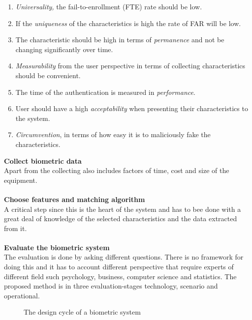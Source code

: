 \begin{enumerate}
	\item \textit{Universality,} the fail-to-enrollment (FTE) rate should be low.
	\item If the \textit{uniqueness} of the characteristics is high the rate of FAR will be low. 
	\item The characteristic should be high in terms of \textit{permanence} and not be changing significantly over time.
	\item \textit{Measurability} from the user perspective in terms of collecting characteristics should be convenient.
	\item The time of the authentication is measured in \textit{performance}.
	\item User should have a high \textit{acceptability} when presenting their characteristics to the system.
	\item \textit{Circumvention}, in terms of how easy it is to maliciously fake the characteristics.
\end{enumerate} 

\textbf{Collect biometric data}\\ 
Apart from the collecting also includes factors of time, cost and size of the equipment.\\
\\
\textbf{Choose features and matching algorithm}\\ 
A critical step since this is the heart of the system and has to bee done with a great deal of knowledge of the selected characteristics and the data extracted from it. \\
\\
\textbf{Evaluate the biometric system}\\ 
The evaluation is done by asking different questions. There is no framework for doing this and it has to account different perspective that require experts of different field such psychology, business, computer science and statistics. The proposed method is in three evaluation-stages technology, scenario and operational. \cite{introbio}
\begin{figure}[!ht]
	
	\caption{\label{fig:biodesigncycle} The design cycle of a biometric system}
\end{figure}
